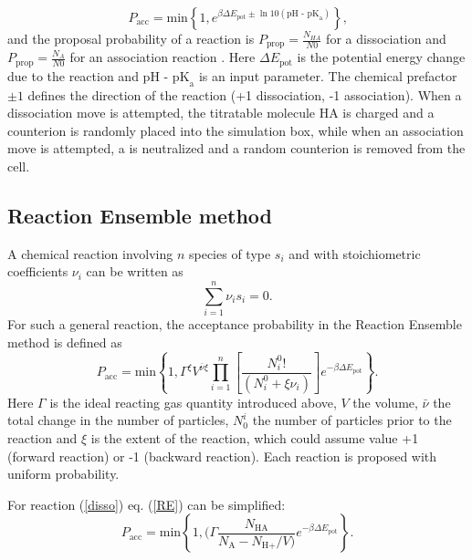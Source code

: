 \documentclass[
a4paper,                        %
11pt,                           %
twoside,                        %
footsepline,                    %
headsepline,                    %
headexclude,                    %
footexclude,                    %
pagesize,                       %
]{scrartcl}
\begin{document}
\begin{equation} 
P_{\text{acc}} = \text{min}\left\lbrace  1, e^{\beta \Delta E_\text{pot} \pm \ln{10} (\text{pH - pK}_\text{a})}\right\rbrace  \text{,}
\end{equation}
and the proposal probability of a reaction is $P_\text{prop}=\frac{N_{HA}}{N0}$ for a dissociation and $P_\text{prop}=\frac{N_{A}}{N0}$ for an association reaction \cite{landsgesell2017simulation}. Here $\Delta E_\text{pot}$ is the potential energy change due to the reaction and $\text{pH - pK}_\text{a}$ is an input parameter. The chemical prefactor $\pm 1$ defines the direction of the reaction (+1 dissociation, -1 association).
When a dissociation move is attempted, the titratable molecule HA is charged and a counterion  is randomly placed into the simulation box, while when an association move is attempted, a  is neutralized and a random counterion  is removed from the cell.


\subsection{Reaction Ensemble method}
A chemical reaction involving ${n}$ species of type ${s_i}$ and with stoichiometric coefficients $\nu_i$ can be written as 
\begin{equation}
\sum_{i = 1}^n \nu_{i} s_i = 0\text{.}
\end{equation}
For such a general reaction, the acceptance probability in the Reaction Ensemble method is defined as
\begin{equation}\label{RE}
P_{\text{acc}} = \text{min} \left\lbrace 1, \Gamma^\xi V^{\bar{\nu}\xi} \prod_{i = 1}^{n} \left[ \frac{N_{i}^0!}{(N_{i}^{0} + \xi \nu_i)}  \right] e^{-\beta \Delta E_\text{pot}}  \right\rbrace\text{.}
\end{equation}
Here $\Gamma$ is the ideal reacting gas quantity introduced above, $V$ the volume, $\bar{\nu}$ the total change in the number of particles, $N_0^i$ the number of particles prior to the reaction and $\xi$ is the extent of the reaction, which could assume value +1 (forward reaction) or -1 (backward reaction). Each reaction is proposed with uniform probability. 

\noindent For reaction (\ref{disso}) eq. (\ref{RE}) can be simplified: 
\begin{equation}
P_{\text{acc}} = \text{min} \left\lbrace 1, (  \Gamma \frac{N_{\text{HA}}}{N_\text{A} - N_{\text{H}+}/V)} e^{-\beta \Delta E_\text{pot}}  \right\rbrace\text{.}
\end{equation}
\end{document}
